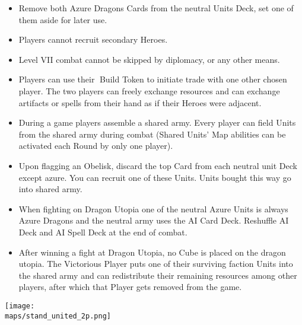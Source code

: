 \begin{multicols}{2}
\begin{itemize}
  \item Remove both Azure Dragons Cards from the neutral Units Deck, set one of them aside for later use.
  \item Players cannot recruit secondary Heroes.
  \item Level VII combat cannot be skipped by diplomacy, or any other means.
  \item Players can use their 🔨Build Token to initiate trade with one other chosen player. The two players can freely exchange resources and can exchange artifacts or spells from their hand as if their Heroes were adjacent.
  \item During a game players assemble a shared army. Every player can field Units from the shared army during combat (Shared Units'  Map abilities can be activated each Round by only one player).
  \item Upon flagging an Obelisk, discard the top Card from each neutral unit Deck except azure. You can recruit one of these Units. Units bought this way go into shared army.
  \item When fighting on Dragon Utopia one of the neutral Azure Units is always Azure Dragons and the neutral army uses the AI Card Deck. Reshuffle AI Deck and AI Spell Deck at the end of combat.
  \item After winning a fight at Dragon Utopia, no Cube is placed on the dragon utopia. The Victorious Player puts one of their surviving faction Units into the shared army and can redistribute their remaining resources among other players, after which that Player gets removed from the game.
\end{itemize}

\columnbreak

\begin{center}
  \texttt{[image: \\maps/stand\_united\_2p.png]}
\end{center}

\vspace*{\fill}

\end{multicols}


